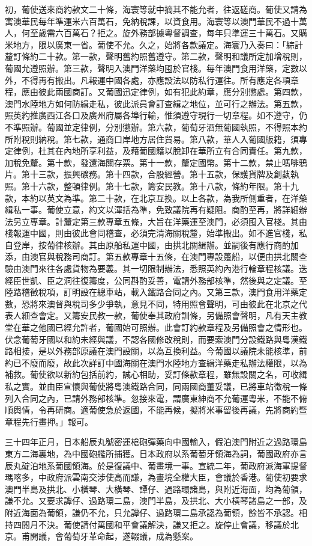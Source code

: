 \begin{pinyinscope}
初，葡使送來商約款文二十條，海寰等就中摘其不能允者，往返磋商。葡使又請為寓澳華民每年準運米六百萬石，免納稅課，以資食用。海寰等以澳門華民不過十萬人，何至歲需六百萬石？拒之。旋外務部據粵督調查，每年只準運三十萬石。又購米地方，限以廣東一省。葡使不允。久之，始將各款議定。海寰乃入奏曰：「綜計釐訂條約二十款。第一款，聲明舊約照舊遵守。第二款，聲明和議所定加增稅則，葡國允遵照辦。第三款，聲明入澳門洋藥均囤於官棧。每年澳門食用洋藥，定數以外，不得再有搬出。凡報運中國各處，亦應設法以防私行運往。所有應定各項章程，應由彼此兩國商訂。又葡國迅定律例，如有犯此約章，應分別懲處。第四款，澳門水陸地方如何防緝走私，彼此派員會訂查緝之地位，並可行之辦法。第五款，照英約推廣西江各口及廣州府屬各埠行輪，惟須遵守現行一切章程。如不遵守，仍不準照辦。葡國並定律例，分別懲辦。第六款，葡萄牙酒無葡國執照，不得照本約所附稅則納稅。第七款，通商口岸地方居住貿易。第八款，華人入葡國版籍，須專定律例，杜其在內地所享利益，及藉葡國籍以脫卸在華所立有合同責任。第九款，加稅免釐。第十款，發還海關存票。第十一款，釐定國幣。第十二款，禁止嗎啡鴉片。第十三款，振興礦務。第十四款，合股經營。第十五款，保護貨牌及創蓺執照。第十六款，整頓律例。第十七款，籌安民教。第十八款，條約年限。第十九款，本約以英文為準。第二十款，在北京互換。以上各款，為我所側重者，在洋藥緝私一事。葡使立意，約文以渾括為準，免致議院再有疑阻。商酌至再，將詳細辦法另立專章。計釐定第三款專章五條，大旨在洋藥運至澳門，必須囤入官棧。其由棧報運中國，則由彼此會同稽查，必須完清海關稅釐，始準搬出。如不進官棧，私自登岸，按葡律核辦。其由原船私運中國，由拱北關緝辦。並嗣後有應行商酌加添，由澳官與稅務司商訂。第五款專章十五條，在澳門專設躉船，以便由拱北關查驗由澳門來往各處貨物為要義。其一切限制辦法，悉照英約內港行輪章程核議。迭經臣世凱、臣之洞往復籌度，公同斟酌妥善，電請外務部核準，然後與之定議。至陸路稽徵稅項，訂明設在總車站，載入鐵路合同之內。又第三款，澳門食用洋藥定數，恐將來澳督與稅司多少爭執，意見不同，特用照會聲明，可由彼此在北京之代表人細查會定。又籌安民教一款，葡使奉其政府訓條，另備照會聲明，凡有天主教堂在華之他國已經允許者，葡國始可照辦。此會訂約款章程及另備照會之情形也。伏念葡萄牙國以和約未經與議，不認各國修改稅則，而要索澳門分設鐵路與粵漢鐵路相接，是以外務部原議在澳門設關，以為互換利益。今葡國以議院未能核準，前約已不廢而廢，故此次詳訂中國海關在澳門水陸地方查緝洋藥走私辦法權限，以為補救。葡使欲以新約包括前約，誠心相助，妥訂條款章程，雖無設關之名，可收緝私之實。並由臣宣懷與葡使將粵澳鐵路合同，同兩國商董妥議，已將車站徵稅一條列入合同之內，已請外務部核準。忽接來電，謂廣東紳商不允葡運粵米，不能不俯順輿情，令再研商。適葡使急於返國，不能再候，擬將米事留後再議，先將商約暨章程先行畫押。」報可。

三十四年正月，日本船辰丸號密運槍砲彈藥向中國輸入，假泊澳門附近之過路環島東方二海裏地，為中國砲艦所捕獲。日本政府以系葡萄牙領海為詞，葡國政府亦言辰丸碇泊地系葡國領海。於是復議中、葡畫境一事。宣統二年，葡政府派海軍提督瑪喀多，中政府派雲南交涉使高而謙，為畫境全權大臣，會議於香港。葡使初要求澳門半島及拱北、小橫琴、大橫琴、譚仔、過路環諸島，與附近海面，均為葡領，謙不允。又要求譚仔、過路環二島，澳門半島，及拱北、大小橫琴諸島之一部，及附近海面為葡領，謙仍不允，只允譚仔、過路環二島承認為葡領，餘皆不承認。相持四閱月不決。葡使請付萬國和平會議解決，謙又拒之。旋停止會議，移議於北京。甫開議，會葡萄牙革命起，遂輟議，成為懸案。


\end{pinyinscope}
